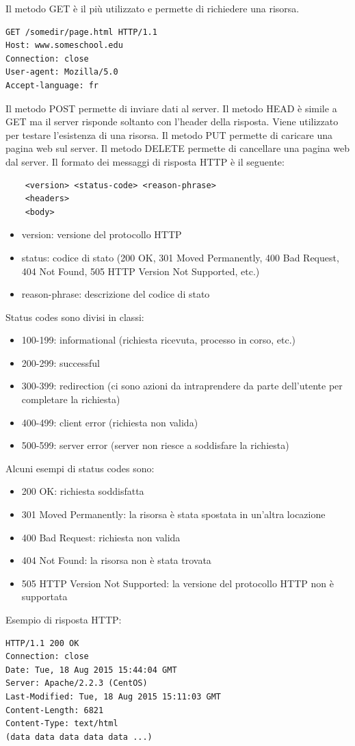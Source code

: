 \documentclass[12pt]{article}
\begin{document}
Il metodo GET è il più utilizzato e permette di richiedere una risorsa.
\begin{verbatim}
GET /somedir/page.html HTTP/1.1
Host: www.someschool.edu
Connection: close
User-agent: Mozilla/5.0
Accept-language: fr
\end{verbatim}
Il metodo POST permette di inviare dati al server.
Il metodo HEAD è simile a GET ma il server risponde soltanto con l'header della risposta. Viene utilizzato per testare l'esistenza di una risorsa.
Il metodo PUT permette di caricare una pagina web sul server.
Il metodo DELETE permette di cancellare una pagina web dal server.
Il formato dei messaggi di risposta HTTP è il seguente:
\begin{verbatim}
    <version> <status-code> <reason-phrase>
    <headers>
    <body>
\end{verbatim}
\begin{itemize}
    \item version: versione del protocollo HTTP
    \item status: codice di stato (200 OK, 301 Moved Permanently, 400 Bad Request, 404 Not Found, 505 HTTP Version Not Supported, etc.)
    \item reason-phrase: descrizione del codice di stato
\end{itemize}
Status codes sono divisi in classi:
\begin{itemize}
    \item 100-199: informational (richiesta ricevuta, processo in corso, etc.)
    \item 200-299: successful
    \item 300-399: redirection (ci sono azioni da intraprendere da parte dell'utente per completare la richiesta)
    \item 400-499: client error (richiesta non valida)
    \item 500-599: server error (server non riesce a soddisfare la richiesta)
\end{itemize}
Alcuni esempi di status codes sono:
\begin{itemize}
    \item 200 OK: richiesta soddisfatta
    \item 301 Moved Permanently: la risorsa è stata spostata in un'altra locazione
    \item 400 Bad Request: richiesta non valida
    \item 404 Not Found: la risorsa non è stata trovata
    \item 505 HTTP Version Not Supported: la versione del protocollo HTTP non è supportata
\end{itemize}
Esempio di risposta HTTP:
\begin{verbatim}
HTTP/1.1 200 OK
Connection: close
Date: Tue, 18 Aug 2015 15:44:04 GMT
Server: Apache/2.2.3 (CentOS)
Last-Modified: Tue, 18 Aug 2015 15:11:03 GMT
Content-Length: 6821
Content-Type: text/html
(data data data data data ...)
\end{verbatim}
\end{document}
